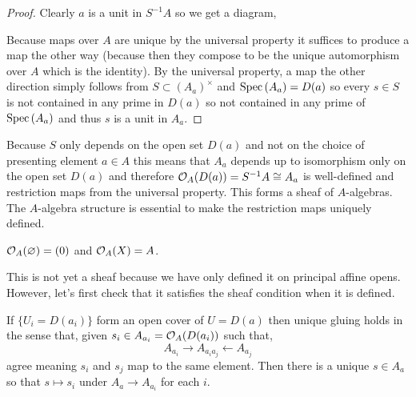 \documentclass[12pt]{article}
\begin{document}
\begin{proof}
Clearly $a$ is a unit in $S^{-1} A$ so we get a diagram,
\begin{center}
\end{center}
Because maps over $A$ are unique by the universal property it suffices to produce a map the other way (because then they compose to be the unique automorphism over $A$ which is the identity). By the universal property, a map the other direction simply follows from $S \subset (A_a)^\times$ and $\mathrm{Spec}\left( A_a \right) = D(a)$ so every $s \in S$ is not contained in any prime in $D(a)$ so not contained in any prime of $\mathrm{Spec}\left( A_a \right)$ and thus $s$ is a unit in $A_a$.  
\end{proof}

\begin{rmk}
Because $S$ only depends on the open set $D(a)$ and not on the choice of presenting element $a \in A$ this means that $A_a$ depends up to isomorphism only on the open set $D(a)$ and therefore $\mathcal{O}_{A}(D(a)) = S^{-1}A \cong A_a$ is well-defined and restriction maps from the universal property. This forms a sheaf of $A$-algebras. The $A$-algebra structure is essential to make the restriction maps uniquely defined. 
\end{rmk}

\begin{example}
$\mathcal{O}_{A}(\varnothing) = (0)$ and $\mathcal{O}_{A}(X) = A$. 
\end{example}

\begin{rmk}
This is not yet a sheaf because we have only defined it on principal affine opens. However, let's first check that it satisfies the sheaf condition when it is defined.
\end{rmk}

\begin{prop}
If $\{ U_i = D(a_i) \}$ form an open cover of $U = D(a)$ then unique gluing holds in the sense that, given $s_i \in A_{a_i} = \mathcal{O}_{A}(D(a_i))$ such that,
\[ A_{a_i} \to A_{a_i a_j} \leftarrow A_{a_j} \]
agree meaning $s_i$ and $s_j$ map to the same element. Then there is a unique $s \in A_a$ so that $s \mapsto s_i$ under $A_a \to A_{a_i}$ for each $i$. 
\end{prop}
\end{document}
